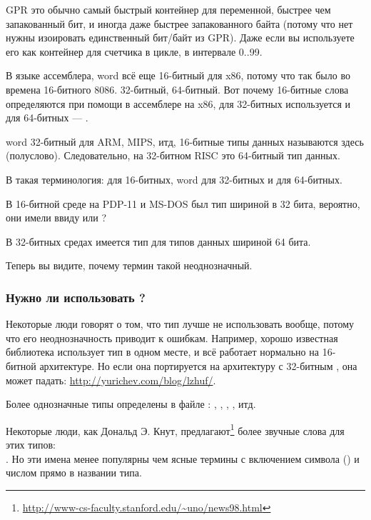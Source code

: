 \ac{GPR} это обычно самый быстрый контейнер для переменной, быстрее чем запакованный бит, и иногда даже быстрее запакованного
байта (потому что нет нужны изоировать единственный бит/байт из \ac{GPR}).
Даже если вы используете его как контейнер для счетчика в цикле, в интервале 0..99.

\myhrule{}

В языке ассемблера, \gls{word} всё еще 16-битный для x86, потому что так было во времена 16-битного 8086.
 32-битный,  64-битный.
Вот почему 16-битные слова определяются при помощи  в ассемблере на x86, для 32-битных используется 
и для 64-битных --- .

\Gls{word} 32-битный для ARM, MIPS, итд, 16-битные типы данных называются здесь  (полуслово).
Следовательно,  на 32-битном RISC это 64-битный тип данных.

В  такая терминология:  для 16-битных, \gls{word} для 32-битных и  для 64-битных.

В 16-битной среде \CCpp{} на PDP-11 и MS-DOS был тип  шириной в 32 бита, вероятно, они имели ввиду
 или ?

В 32-битных средах \CCpp{} имеется тип  для типов данных шириной 64 бита.

Теперь вы видите, почему термин  такой неоднозначный.

\subsubsection{Нужно ли использовать ?}

Некоторые люди говорят о том, что тип  лучше не использовать вообще, потому что его неоднозначность приводит
к ошибкам.
Например, хорошо известная библиотека  использует тип  в одном месте, и всё работает нормально на 16-битной
архитектуре.
Но если она портируется на архитектуру с 32-битным , она может падать: \url{http://yurichev.com/blog/lzhuf/}.

Более однозначные типы определены в файле :
, , , , итд.

Некоторые люди, как Дональд Э. Кнут, предлагают\footnote{\url{http://www-cs-faculty.stanford.edu/~uno/news98.html}}
более звучные слова для этих типов:\\
.
Но эти имена менее популярны чем ясные термины с включением символа  ()
и числом прямо в названии типа.

